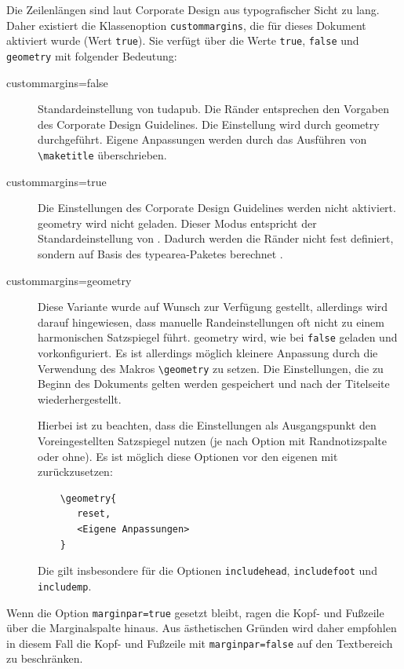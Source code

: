 \documentclass[
	ngerman,
	ruledheaders=chapter,%
	class=book,%
	thesis={
		type=dr,
		dr=rernat
	},
	accentcolor=9c,%
	custommargins=true,%
	marginpar=false,%
	fontsize=11pt,%
]{tudapub}
\let\code\texttt
\let\pck\textsf
\let\cls\textsf
\begin{document}
Die Zeilenlängen sind laut Corporate Design aus typografischer Sicht zu lang.
Daher existiert die Klassenoption \code{custommargins}, die für dieses Dokument aktiviert wurde (Wert \code{true}). Sie verfügt über die Werte \code{true}, \code{false} und \code{geometry} mit folgender Bedeutung:

\begin{description}
\item[custommargins=false] Standardeinstellung von \cls{tudapub}. Die Ränder entsprechen den Vorgaben des Corporate Design Guidelines. Die Einstellung wird durch \pck{geometry} durchgeführt. Eigene Anpassungen werden durch das Ausführen von \code{\textbackslash{}maketitle} überschrieben.
\item[custommargins=true] Die Einstellungen des Corporate Design Guidelines werden nicht aktiviert. \pck{geometry} wird nicht geladen. Dieser Modus entspricht der Standardeinstellung von \KOMAScript{}. Dadurch werden die Ränder nicht fest definiert, sondern auf Basis des \pck{typearea}-Paketes berechnet \cite[vgl.][]{scrguide}.
\item[custommargins=geometry]  Diese Variante wurde auf Wunsch zur Verfügung gestellt, allerdings wird darauf hingewiesen, dass manuelle Randeinstellungen oft nicht zu einem harmonischen Satzspiegel führt.
\pck{geometry} wird, wie bei \code{false} geladen und vorkonfiguriert. Es ist allerdings möglich kleinere Anpassung durch die Verwendung des Makros \code{\textbackslash{}geometry} zu setzen. Die Einstellungen, die zu Beginn des Dokuments gelten werden gespeichert und nach der Titelseite wiederhergestellt.

Hierbei ist zu beachten, dass die Einstellungen als Ausgangspunkt den Voreingestellten Satzspiegel nutzen (je nach Option mit Randnotizspalte oder ohne). Es ist möglich diese Optionen vor den eigenen mit zurückzusetzen:
\begin{verbatim}
	\geometry{
	   reset,
	   <Eigene Anpassungen>
	}
\end{verbatim}
Die gilt insbesondere für die Optionen \code{includehead}, \code{includefoot} und \code{includemp}.
\end{description}


Wenn die Option \code{marginpar=true} gesetzt bleibt, ragen die Kopf- und Fußzeile über die Marginalspalte hinaus. Aus ästhetischen Gründen wird daher empfohlen in diesem Fall die Kopf- und Fußzeile  mit \code{marginpar=false}  auf den Textbereich zu beschränken.
\end{document}
